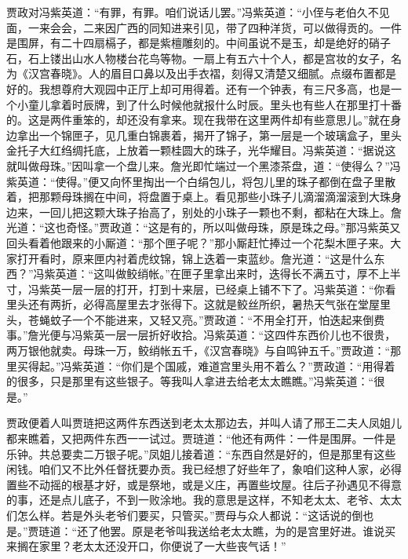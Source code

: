 \begin{parag}
    贾政对冯紫英道：“有罪，有罪。咱们说话儿罢。”冯紫英道：“小侄与老伯久不见面，一来会会，二来因广西的同知进来引见，带了四种洋货，可以做得贡的。一件是围屏，有二十四扇槅子，都是紫檀雕刻的。中间虽说不是玉，却是绝好的硝子石，石上镂出山水人物楼台花鸟等物。一扇上有五六十个人，都是宫妆的女子，名为《汉宫春晓》。人的眉目口鼻以及出手衣褶，刻得又清楚又细腻。点缀布置都是好的。我想尊府大观园中正厅上却可用得着。还有一个钟表，有三尺多高，也是一个小童儿拿着时辰牌，到了什么时候他就报什么时辰。里头也有些人在那里打十番的。这是两件重笨的，却还没有拿来。现在我带在这里两件却有些意思儿。”就在身边拿出一个锦匣子，见几重白锦裹着，揭开了锦子，第一层是一个玻璃盒子，里头金托子大红绉绸托底，上放着一颗桂圆大的珠子，光华耀目。冯紫英道：“据说这就叫做母珠。”因叫拿一个盘儿来。詹光即忙端过一个黑漆茶盘，道：“使得么？”冯紫英道：“使得。”便又向怀里掏出一个白绢包儿，将包儿里的珠子都倒在盘子里散着，把那颗母珠搁在中间，将盘置于桌上。看见那些小珠子儿滴溜滴溜滚到大珠身边来，一回儿把这颗大珠子抬高了，别处的小珠子一颗也不剩，都粘在大珠上。詹光道：“这也奇怪。”贾政道：“这是有的，所以叫做母珠，原是珠之母。”那冯紫英又回头看着他跟来的小厮道：“那个匣子呢？”那小厮赶忙捧过一个花梨木匣子来。大家打开看时，原来匣内衬着虎纹锦，锦上迭着一束蓝纱。詹光道：“这是什么东西？”冯紫英道：“这叫做鲛绡帐。”在匣子里拿出来时，迭得长不满五寸，厚不上半寸，冯紫英一层一层的打开，打到十来层，已经桌上铺不下了。冯紫英道：“你看里头还有两折，必得高屋里去才张得下。这就是鲛丝所织，暑热天气张在堂屋里头，苍蝇蚊子一个不能进来，又轻又亮。”贾政道：“不用全打开，怕迭起来倒费事。”詹光便与冯紫英一层一层折好收拾。冯紫英道：“这四件东西价儿也不很贵，两万银他就卖。母珠一万，鲛绡帐五千，《汉宫春晓》与自鸣钟五千。”贾政道：“那里买得起。”冯紫英道：“你们是个国戚，难道宫里头用不着么？”贾政道：“用得着的很多，只是那里有这些银子。等我叫人拿进去给老太太瞧瞧。”冯紫英道：“很是。”
\end{parag}


\begin{parag}
    贾政便着人叫贾琏把这两件东西送到老太太那边去，并叫人请了邢王二夫人凤姐儿都来瞧着，又把两件东西一一试过。贾琏道：“他还有两件：一件是围屏。一件是乐钟。共总要卖二万银子呢。”凤姐儿接着道：“东西自然是好的，但是那里有这些闲钱。咱们又不比外任督抚要办贡。我已经想了好些年了，象咱们这种人家，必得置些不动摇的根基才好，或是祭地，或是义庄，再置些坟屋。往后子孙遇见不得意的事，还是点儿底子，不到一败涂地。我的意思是这样，不知老太太、老爷、太太们怎么样。若是外头老爷们要买，只管买。”贾母与众人都说：“这话说的倒也是。”贾琏道：“还了他罢。原是老爷叫我送给老太太瞧，为的是宫里好进。谁说买来搁在家里？老太太还没开口，你便说了一大些丧气话！”
\end{parag}



